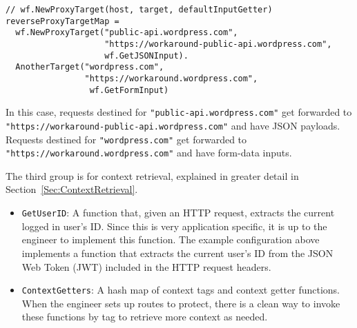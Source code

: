 \begin{lstlisting}
// wf.NewProxyTarget(host, target, defaultInputGetter)
reverseProxyTargetMap = 
  wf.NewProxyTarget("public-api.wordpress.com", 
                    "https://workaround-public-api.wordpress.com", 
                    wf.GetJSONInput).
  AnotherTarget("wordpress.com", 
                "https://workaround.wordpress.com",
                 wf.GetFormInput)
\end{lstlisting}

In this case, requests destined for \lstinline{"public-api.wordpress.com"} get forwarded to \\ \lstinline{"https://workaround-public-api.wordpress.com"} and have JSON payloads. Requests destined for \lstinline{"wordpress.com"} get forwarded to \lstinline{"https://workaround.wordpress.com"} and have form-data inputs. 

\iffalse
The \lstinline{FrontendAddress} should naturally be set to the

The \lstinline{ReverseProxyTargetMap} is a hash map of hosts and targets, along with their respective default input getters described in Section~\ref{Sec:DefaultInputGetters}. This field tells the firewall to catch requests of a given \lstinline{host} and forward it to a specific \lstinline{target}. There are separate default input getters since requests going to different hosts may have different representations of their payloads. The following is the \lstinline{ReverseProxyTargetMap} from the firewall configuration for Calypso:

The \lstinline{ReverseProxyAddress} should be set to the address where the firewall should attach itself and listen on.
\fi

\noindent The third group is for context retrieval, explained in greater detail in Section~\ref{Sec:ContextRetrieval}. 

\begin{itemize}[nosep]
\item \lstinline{GetUserID}: A function that, given an HTTP request, extracts the current logged in user's ID. Since this is very application specific, it is up to the engineer to implement this function. The example configuration above implements a function that extracts the current user's ID from the JSON Web Token (JWT) included in the HTTP request headers.

\item \lstinline{ContextGetters}: A hash map of context tags and context getter functions. When the engineer sets up routes to protect, there is a clean way to invoke these functions by tag to retrieve more context as needed.
\end{itemize}

